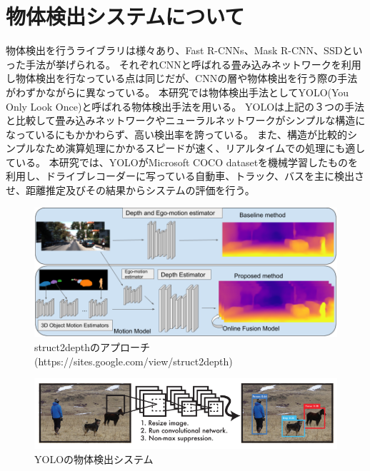 \section{物体検出システムについて}
物体検出を行うライブラリは様々あり、Fast R-CNNs\cite{ren2015faster}、Mask R-CNN\cite{he2017mask}、SSD\cite{liu2016ssd}といった手法が挙げられる。
それぞれCNNと呼ばれる畳み込みネットワークを利用し物体検出を行なっている点は同じだが、CNNの層や物体検出を行う際の手法がわずかながらに異なっている。
本研究では物体検出手法としてYOLO(You Only Look Once)\cite{yolov3}と呼ばれる物体検出手法を用いる。
YOLOは上記の３つの手法と比較して畳み込みネットワークやニューラルネットワークがシンプルな構造になっているにもかかわらず、高い検出率を誇っている。
また、構造が比較的シンプルなため演算処理にかかるスピードが速く、リアルタイムでの処理にも適している。
本研究では、YOLOがMicrosoft COCO datasetを機械学習したものを利用し、ドライブレコーダーに写っている自動車、トラック、バスを主に検出させ、距離推定及びその結果からシステムの評価を行う。

\newpage

\begin{figure}[htbp]
  \begin{center}
   \includegraphics[width=12cm]{figs/aproach_depth.png}
  \end{center}
  \caption{struct2depthのアプローチ(https://sites.google.com/view/struct2depth)}
  \label{fig:approach_depth}
\end{figure}

\begin{figure}[hbtp]
  \begin{center}
    \includegraphics[width=12cm]{figs/Yolo_Detection_system.png}
    \caption{YOLOの物体検出システム\cite{yolov3}}
    \label{fig:yolo_system}
  \end{center}
\end{figure}

